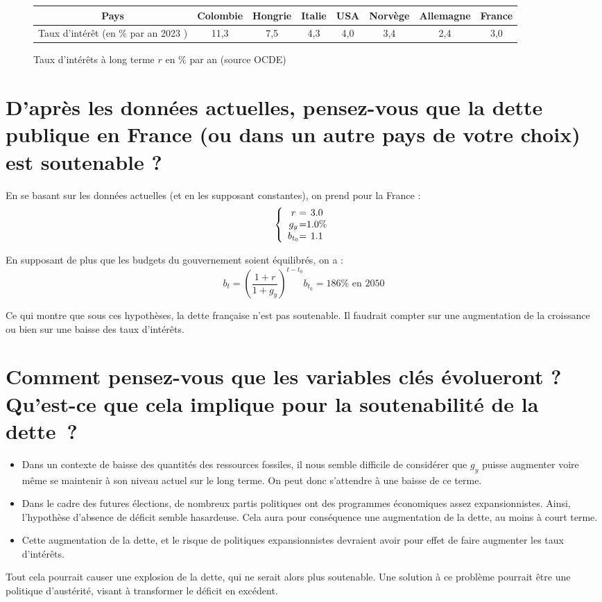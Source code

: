 \documentclass{article}
\begin{document}
\begin{figure}[h!]
    \centering
    \begin{tabular}{ | c | c | c |  c |  c |  c |  c |  c | }
      \hline
      Pays & Colombie & Hongrie & Italie & USA  & Norvège & Allemagne & France \\ \hline
      Taux d'intérêt (en \% par an 2023 ) & 11,3 & 7,5 & 4,3 & 4,0 & 3,4 & 2,4 & 3,0 \\ \hline
    \end{tabular}
    \caption{Taux d'intérêts à long terme $r$ en \% par an (source OCDE)}
\end{figure}
    
\newpage

\section{D’après les données actuelles, pensez-vous que la dette publique en France (ou dans un autre pays
de votre choix) est soutenable ?}

En se basant sur les données actuelles (et en les supposant constantes), on prend pour la France :
\[
\left \{
\begin{array}{c @{=} c}
    r & 3.0 \\
    g_y & 1.0 \% \\
    b_{t_0} & 1.1
 \end{array}
\right.
\]

En supposant de plus que les budgets du gouvernement soient équilibrés, on a :
$$b_t = (\frac{1 + r}{1 + g_y})^{t-t_0}b_{t_0} = 186 \% \text{ en 2050}$$

Ce qui montre que sous ces hypothèses, la dette française n'est pas soutenable. Il faudrait compter sur une augmentation de la croissance ou bien sur une baisse des taux d'intérêts. 

\section{Comment pensez-vous que les variables clés évolueront ? Qu’est-ce que cela implique pour la
soutenabilité de la dette~?}

\begin{itemize}
  \item Dans un contexte de baisse des quantités des ressources fossiles, il nous semble difficile de considérer que $g_y$ puisse augmenter voire même se maintenir à son niveau actuel sur le long terme. On peut donc s'attendre à une baisse de ce terme.
  \item Dans le cadre des futures élections, de nombreux partis politiques ont des programmes économiques assez expansionnistes. Ainsi, l'hypothèse d'absence de déficit semble hasardeuse. Cela aura pour conséquence une augmentation de la dette, au moins à court terme.
  \item Cette augmentation de la dette, et le risque de politiques expansionnistes devraient avoir pour effet de faire augmenter les taux d'intérêts.
\end{itemize}

Tout cela pourrait causer une explosion de la dette, qui ne serait alors plus soutenable. Une solution à ce problème pourrait être une politique d'austérité, visant à transformer le déficit en excédent. 
\end{document}
